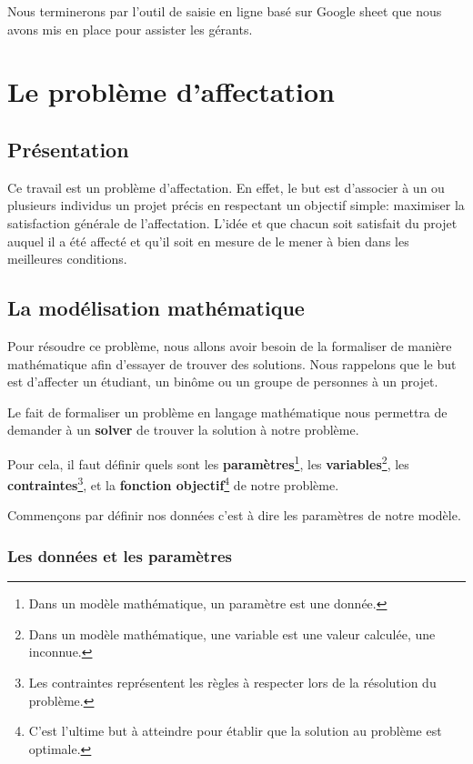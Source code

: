 \documentclass[final,poster]{polytech/polytech}
\begin{document}
Nous terminerons par l'outil de saisie en ligne basé sur Google sheet que nous avons mis en place pour assister les gérants.

\chapter{Le problème d'affectation\label{chap:pb_affectation}}


\section{Présentation\label{sec:pres_affectation}}


Ce travail est un problème d'affectation.
En effet, le but est d'associer à un ou plusieurs individus un projet précis en respectant un objectif simple: maximiser la satisfaction générale de l'affectation.
L'idée et que chacun soit satisfait du projet auquel il a été affecté et qu'il soit en mesure de le mener à bien dans les meilleures conditions.


\section{La modélisation mathématique\label{sec:mod_math}}


Pour résoudre ce problème, nous allons avoir besoin de la formaliser de manière mathématique afin d'essayer de trouver des solutions.
Nous rappelons que le but est d'affecter un étudiant, un binôme ou un groupe de personnes à un projet.

Le fait de formaliser un problème en langage mathématique nous permettra de demander à un \textbf{solver} de trouver la solution à notre problème.

Pour cela, il faut définir quels sont les \textbf{paramètres}\footnote{Dans un modèle mathématique, un paramètre est une donnée.}, les \textbf{ variables}\footnote{Dans un modèle mathématique, une variable est une valeur calculée, une inconnue.}, les \textbf{contraintes}\footnote{Les contraintes représentent les règles à respecter lors de la résolution du problème.}, et la \textbf{fonction objectif}\footnote{C'est l'ultime but à atteindre pour établir que la solution au problème est optimale.} de notre problème.

Commençons par définir nos données c'est à dire les paramètres de notre modèle.

\subsection{Les données et les paramètres\label{sec:donnees_params}}
\end{document}

